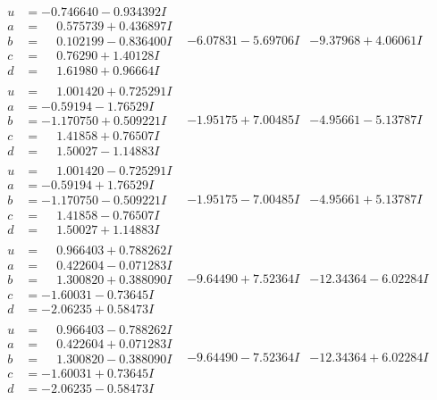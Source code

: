 \documentclass[1p]{elsarticle_modified}
\theoremstyle{definition}
\begin{document}
$$\begin{array}{c|c|c}
\begin{aligned}
u &= -0.746640 - 0.934392 I \\
a &= \phantom{-}0.575739 + 0.436897 I \\
b &= \phantom{-}0.102199 - 0.836400 I \\
c &= \phantom{-}0.76290 + 1.40128 I \\
d &= \phantom{-}1.61980 + 0.96664 I\end{aligned}
 & -6.07831 - 5.69706 I & -9.37968 + 4.06061 I \\ \hline\begin{aligned}
u &= \phantom{-}1.001420 + 0.725291 I \\
a &= -0.59194 - 1.76529 I \\
b &= -1.170750 + 0.509221 I \\
c &= \phantom{-}1.41858 + 0.76507 I \\
d &= \phantom{-}1.50027 - 1.14883 I\end{aligned}
 & -1.95175 + 7.00485 I & -4.95661 - 5.13787 I \\ \hline\begin{aligned}
u &= \phantom{-}1.001420 - 0.725291 I \\
a &= -0.59194 + 1.76529 I \\
b &= -1.170750 - 0.509221 I \\
c &= \phantom{-}1.41858 - 0.76507 I \\
d &= \phantom{-}1.50027 + 1.14883 I\end{aligned}
 & -1.95175 - 7.00485 I & -4.95661 + 5.13787 I \\ \hline\begin{aligned}
u &= \phantom{-}0.966403 + 0.788262 I \\
a &= \phantom{-}0.422604 - 0.071283 I \\
b &= \phantom{-}1.300820 + 0.388090 I \\
c &= -1.60031 - 0.73645 I \\
d &= -2.06235 + 0.58473 I\end{aligned}
 & -9.64490 + 7.52364 I & -12.34364 - 6.02284 I \\ \hline\begin{aligned}
u &= \phantom{-}0.966403 - 0.788262 I \\
a &= \phantom{-}0.422604 + 0.071283 I \\
b &= \phantom{-}1.300820 - 0.388090 I \\
c &= -1.60031 + 0.73645 I \\
d &= -2.06235 - 0.58473 I\end{aligned}
 & -9.64490 - 7.52364 I & -12.34364 + 6.02284 I\\

\end{array}$$
\end{document}
